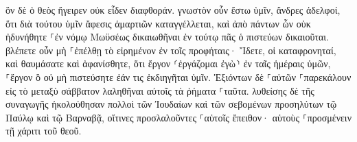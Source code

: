 \documentclass{openreader}
\begin{document}
ὃν δὲ ὁ θεὸς ἤγειρεν οὐκ εἶδεν διαφθοράν. 
γνωστὸν οὖν ἔστω ὑμῖν, ἄνδρες ἀδελφοί, ὅτι διὰ τούτου ὑμῖν ἄφεσις ἁμαρτιῶν καταγγέλλεται, καὶ ἀπὸ πάντων ὧν οὐκ ἠδυνήθητε ⸀ἐν νόμῳ Μωϋσέως δικαιωθῆναι 
ἐν τούτῳ πᾶς ὁ πιστεύων δικαιοῦται. 
βλέπετε οὖν μὴ ⸀ἐπέλθῃ τὸ εἰρημένον ἐν τοῖς προφήταις· 
Ἴδετε, οἱ καταφρονηταί, καὶ θαυμάσατε καὶ ἀφανίσθητε, ὅτι ἔργον ⸂ἐργάζομαι ἐγὼ⸃ ἐν ταῖς ἡμέραις ὑμῶν, ⸀ἔργον ὃ οὐ μὴ πιστεύσητε ἐάν τις ἐκδιηγῆται ὑμῖν. 
Ἐξιόντων δὲ ⸀αὐτῶν ⸀παρεκάλουν εἰς τὸ μεταξὺ σάββατον λαληθῆναι αὐτοῖς τὰ ῥήματα ⸀ταῦτα. 
λυθείσης δὲ τῆς συναγωγῆς ἠκολούθησαν πολλοὶ τῶν Ἰουδαίων καὶ τῶν σεβομένων προσηλύτων τῷ Παύλῳ καὶ τῷ Βαρναβᾷ, οἵτινες προσλαλοῦντες ⸀αὐτοῖς ἔπειθον· αὐτοὺς ⸀προσμένειν τῇ χάριτι τοῦ θεοῦ. 
\end{document}
